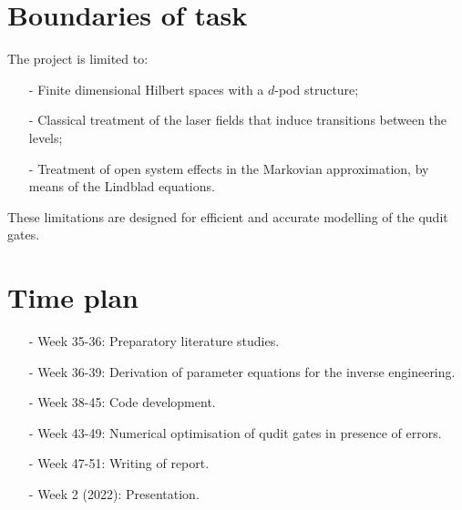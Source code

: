\documentclass{article}
\begin{document}
\section*{Boundaries of task}
The project is limited to: 
\begin{itemize}

\item[-] Finite dimensional Hilbert spaces with a $d$-pod structure; 

\item[-] Classical treatment of the laser fields that induce transitions between the levels; 

\item[-] Treatment of open system effects in the Markovian approximation, by means 
of the Lindblad equations. 

\end{itemize}
These limitations are designed for efficient and accurate modelling of the qudit gates.  

\section*{Time plan}
\begin{itemize}

\item[-] Week 35-36: Preparatory literature studies. 
  
\item[-] Week 36-39: Derivation of parameter equations for the inverse engineering. 

\item[-]  Week 38-45: Code development.  

\item[-] Week 43-49: Numerical optimisation of qudit gates in presence of errors. 

\item[-] Week 47-51: Writing of report. 

\item[-] Week 2 (2022): Presentation.   

\end{itemize}
\end{document}
